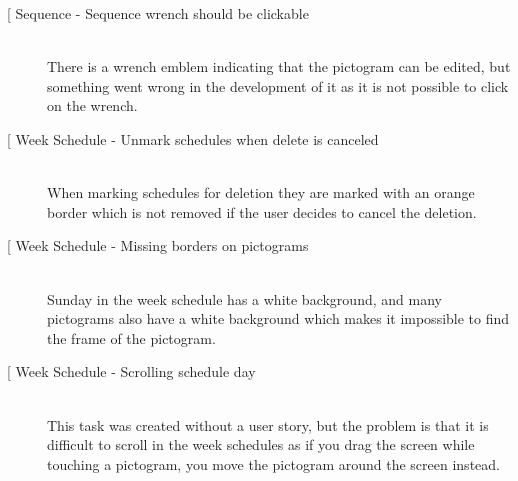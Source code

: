 \begin{description}
    \item[{[}\phigh{]} Sequence - Sequence wrench should be clickable] \hfill \\
        There is a wrench emblem indicating that the pictogram can be edited, but something went wrong in the development of it as it is not possible to click on the wrench.
    \item[{[}\phigh{]} Week Schedule - Unmark schedules when delete is canceled] \hfill \\
        When marking schedules for deletion they are marked with an orange border which is not removed if the user decides to cancel the deletion.
    \item[{[}\phigh{]} Week Schedule - Missing borders on pictograms] \hfill \\
        Sunday in the week schedule has a white background, and many pictograms also have a white background which makes it impossible to find the frame of the pictogram.
    \item[{[}\phigh{]} Week Schedule - Scrolling schedule day] \hfill\\
        This task was created without a user story, but the problem is that it is difficult to scroll in the week schedules as if you drag the screen while touching a pictogram, you move the pictogram around the screen instead.
\end{description}

